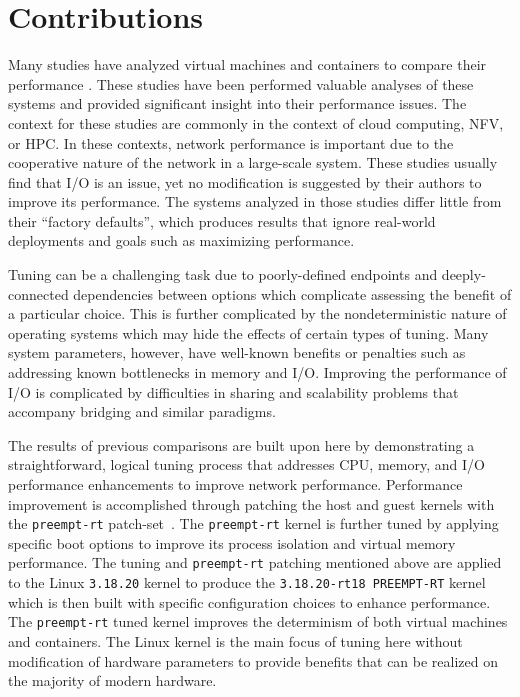 \section{Contributions} %
\label{sec:introcontributiions}
Many studies have analyzed virtual machines and containers to compare their performance \autocite{soltesz2007container, matthews2007quantifying, gomes2014performance, seo2014performance, morabitohypervisors, xavier2013performance, _felter_1, rathore2013kvm, _scheepers_1, wangAllocation2007, _younge_1, _che_}.
These studies have been performed valuable analyses of these systems and provided significant insight into their performance issues.
The context for these studies are commonly in the context of cloud computing, NFV, or HPC.
In these contexts, network performance is important due to the cooperative nature of the network in a large-scale system.
These studies usually find that I/O is an issue, yet no modification is suggested by their authors to improve its performance.
The systems analyzed in those studies differ little from their ``factory defaults'', which produces results that ignore real-world deployments and goals such as maximizing performance.

Tuning can be a challenging task due to poorly-defined endpoints and deeply-connected dependencies between options which complicate assessing the benefit of a particular choice.
This is further complicated by the nondeterministic nature of operating systems which may hide the effects of certain types of tuning.
Many system parameters, however, have well-known benefits or penalties such as addressing known bottlenecks in memory and I/O.  
Improving the performance of I/O is complicated by difficulties in sharing and scalability problems that accompany bridging and similar paradigms.

The results of previous comparisons are built upon here by demonstrating a straightforward, logical tuning process that addresses CPU, memory, and I/O performance enhancements to improve network performance.
Performance improvement is accomplished through patching the host and guest kernels with the \texttt{preempt-rt} patch-set~\autocite{preemptrtpatches}.
The \texttt{preempt-rt} kernel is further tuned by applying specific boot options to improve its process isolation and virtual memory performance.
The tuning and \texttt{preempt-rt} patching mentioned above are applied to the Linux \texttt{3.18.20} kernel to produce the \texttt{3.18.20-rt18 PREEMPT-RT} kernel which is then built with specific configuration choices to enhance performance. 
The \texttt{preempt-rt} tuned kernel improves the determinism of both virtual machines and containers.
The Linux kernel is the main focus of tuning here without modification of hardware parameters to provide benefits that can be realized on the majority of modern hardware.

